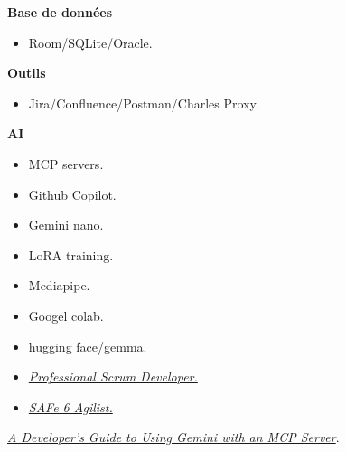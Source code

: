 \documentclass[10pt,a4paper,withhyper]{altacv}
\begin{document}
\begin{paracol}{2}
\textbf{Base de données}

\begin{itemize}
	\item Room/SQLite/Oracle.
\end{itemize}
\divider

\textbf{Outils}

\begin{itemize}
	\item Jira/Confluence/Postman/Charles Proxy.
\end{itemize}
\divider

\textbf{AI}

\begin{itemize}
	\item MCP servers.
	\item Github Copilot.
	\item Gemini nano.
	\item LoRA training.
	\item Mediapipe.
	\item Googel colab.
	\item hugging face/gemma.
\end{itemize}




\divider

\divider




\begin{itemize}
\item \href{https://www.scrum.org/user/418540}{\textit{Professional Scrum Developer.}}
\item \href{https://drive.google.com/file/d/1NZk4r5TWXaY0Wp3Xjmo-ku7Hr-xPkmTo/view?usp=sharing}{\textit{SAFe 6 Agilist.}}
\end{itemize}





\href{https://medium.com/@slimaniiyassine/a-developers-guide-to-using-gemini-with-an-mcp-server-05878c418097}{\textit{A Developer’s Guide to Using Gemini with an MCP Server}}.




\end{paracol}
\end{document}
